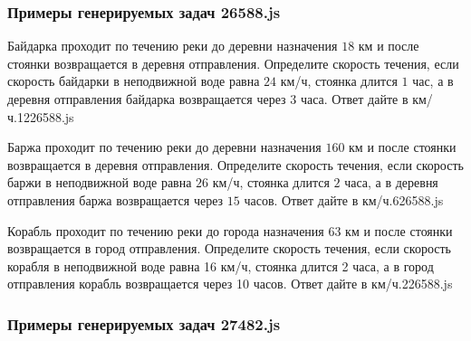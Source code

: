 
\subsubsection*{Примеры генерируемых задач 26588.js}   

\par{Байдарка проходит по течению реки до деревни назначения $18$ км и после стоянки возвращается в деревня отправления. Определите скорость течения, если скорость байдарки в неподвижной воде равна $24$ км/ч, стоянка длится $1$ час, а в деревня отправления байдарка возвращается через $3$ часа. Ответ дайте в км/ч.}{12}{26588.js}
\par{Баржа проходит по течению реки до деревни назначения $160$ км и после стоянки возвращается в деревня отправления. Определите скорость течения, если скорость баржи в неподвижной воде равна $26$ км/ч, стоянка длится $2$ часа, а в деревня отправления баржа возвращается через $15$ часов. Ответ дайте в км/ч.}{6}{26588.js}
\par{Корабль проходит по течению реки до города назначения 63 км и после стоянки возвращается в город отправления. Определите скорость течения, если скорость корабля в неподвижной воде равна 16 км/ч, стоянка длится 2 часа, а в город отправления корабль возвращается через 10 часов. Ответ дайте в км/ч.}{2}{26588.js}


\subsubsection*{Примеры генерируемых задач 27482.js}   

